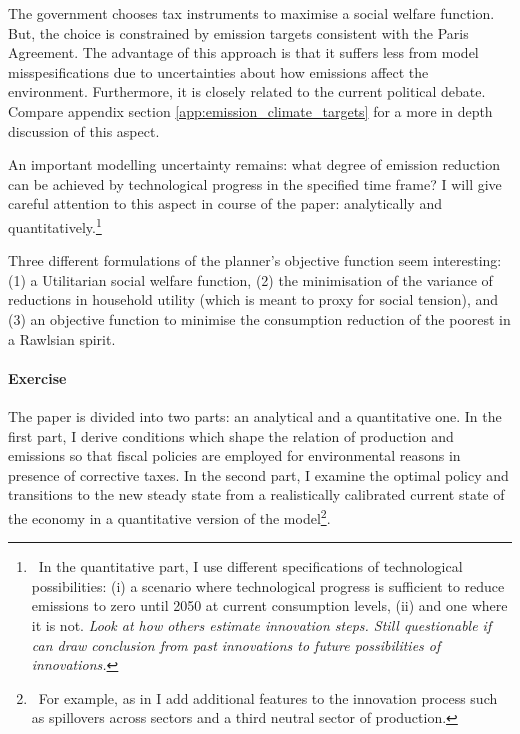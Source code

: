 The government chooses tax instruments to maximise a 
social welfare function. But, the choice is constrained by emission targets consistent with the Paris Agreement. The advantage of this approach is that it suffers less from  model misspesifications due to  uncertainties about how emissions affect the environment. Furthermore, it is closely related to the current political debate. Compare appendix section \ref{app:emission_climate_targets} for a more in depth discussion of this aspect.  


An important modelling uncertainty remains: what degree of emission reduction can be achieved by technological progress in the specified time frame? I will give careful attention to this aspect in course of the paper: analytically and quantitatively.\footnote{\ In the quantitative part, I use different specifications of technological possibilities: (i) a scenario where technological progress is sufficient to reduce emissions to zero until 2050 at current consumption levels, (ii) and one where it is not. \textit{ Look at how others estimate innovation steps. Still questionable if can draw conclusion from past innovations to future possibilities of innovations. }}


Three different formulations of the planner's objective function seem interesting: (1) a Utilitarian social welfare function, (2) the minimisation of the variance of reductions in household utility (which is meant to proxy for social tension), and (3) an objective function to minimise the consumption reduction of the poorest in a Rawlsian spirit. 


\paragraph{Exercise}
The paper is divided into two parts: an analytical and a quantitative one.
In the first part, I derive  conditions which shape the relation of production and emissions so that fiscal policies are employed for environmental reasons in presence  of corrective taxes.  
In the second part, I examine the optimal policy and transitions to the new steady state from a realistically calibrated current state of the economy in a quantitative version of the model\footnote{\ For example, as in  \cite{Fried2018ClimateAnalysis} I add additional features to the innovation process such as spillovers across sectors and a third neutral sector of production.}.


